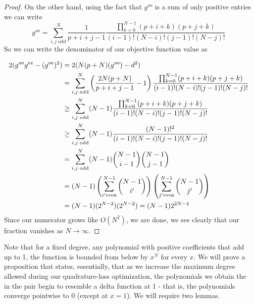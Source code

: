 \documentclass{article}
\theoremstyle{definition}
\theoremstyle{remark}
\numberwithin{equation}{section}
\begin{document}
\begin{proof}
On the other hand, using the fact that $g^{oo}$ is a sum of only positive entries we can write 
\[g^{oo} = \sum_{i,j \text{ odd}}^N \frac{1}{p+i+j-1} \frac{\prod_{k=0}^{N-1} (p+i+k)(p+j+k)}{(i-1)! (N-i)! (j-1)! (N-j)!}\]
So we can write the denominator of our objective function value as

\begin{align*} 2(g^{oo} g^{ee}-(g^{oe})^2) &= 2(N(p+N)(g^{oo}) - d^2)\\ &= \sum_{i,j \text{ odd}}^N \left( \frac{2N(p+N)}{p+i+j-1} - 1\right) \frac{\prod_{k=0}^{N-1} (p+i+k)(p+j+k)}{(i-1)! (N-i)! (j-1)! (N-j)!} \\
& \ge \sum_{i,j \text{ odd}}^N (N-1) \frac{\prod_{k=0}^{N-1} (p+i+k)(p+j+k)}{(i-1)! (N-i)! (j-1)! (N-j)!}\\
&\ge \sum_{i,j \text{ odd}}^N (N-1) \frac{(N-1)!^2}{(i-1)! (N-i)! (j-1)! (N-j)!} \\
&= \sum_{i,j \text{ odd}}^N (N-1) \dbinom{N-1}{i-1} \dbinom{N-1}{j-1}\\
&= (N-1) \left(\sum_{i' \text{even}}^{N-1} \dbinom{N-1}{i'}\right) \left( \sum_{j' \text{even}}^{N-1} \dbinom{N-1}{j'}\right)\\
&= (N-1)(2^{N-2})(2^{N-2}) = (N-1)2^{2N-4}
\end{align*} 
Since our numerator grows like $O(N^2)$, we are done, we see clearly that our fraction vanishes as $N \to \infty$. \end{proof}

Note that for a fixed degree, any polynomial with positive coefficients that add up to 1, the function is bounded from below by $x^N$ for every $x$. We will prove a proposition that states, essentially, that as we increase the maximum degree allowed during our quadrature-loss optimization, the polynomials we obtain the in the pair begin to resemble a delta function at 1 - that is, the polynomials converge pointwise to 0 (except at $x=1$). We will require two lemmas. 
\end{document}
